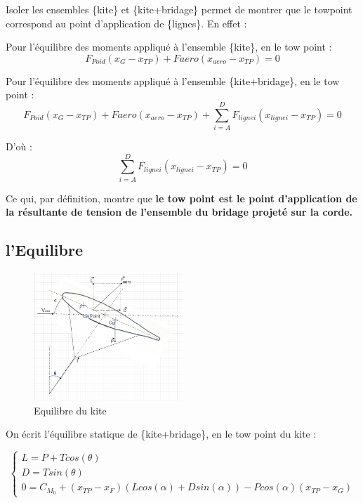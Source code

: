 \documentclass[conference]{IEEEtran}
\begin{document}
Isoler les ensembles \{kite\} et \{kite+bridage\} permet de montrer que le towpoint correspond au point d'application de \{lignes\}. En effet :

Pour l'équilibre des moments appliqué à l'ensemble \{kite\}, en le tow point :
\begin{equation}
    F_{Poid}(x_G-x_{TP})+F{aero}(x_{aero}-x_{TP}) = 0
\end{equation}

Pour l'équilibre des moments appliqué à l'ensemble \{kite+bridage\}, en le tow point :
\begin{equation}
    F_{Poid}(x_G-x_{TP}) + F{aero}(x_{aero}-x_{TP}) + \sum_{i=A}^{D} F_{ligne i}(x_{ligne i}-x_{TP})= 0
\end{equation}

D'où : 
\begin{equation}
    \sum_{i=A}^{D} F_{ligne i}(x_{ligne i}-x_{TP})= 0
\end{equation}

Ce qui, par définition, montre que \textbf{le tow point est le point d'application de la résultante de tension de l'ensemble du bridage projeté sur la corde.}

\subsection{l'Equilibre} 

\begin{figure}[H]
    \centering
    \includegraphics[width=0.5\textwidth]{Pics/Equilibre Kite.png}  
    \caption{Equilibre du kite}
    \label{fig:Equilibre du kite}
\end{figure}

On écrit l'équilibre statique de \{kite+bridage\}, en le tow point du kite : 

\begin{equation}
    \begin{cases}
        L = P + T cos(\theta) \\
        D = T sin(\theta) \\
        0 = C_{M_0} + (x_{TP} - x_F) (L cos(\alpha) + D sin(\alpha)) - P cos(\alpha) (x_{TP} - x_G)
    \end{cases}
\end{equation}
\end{document}
